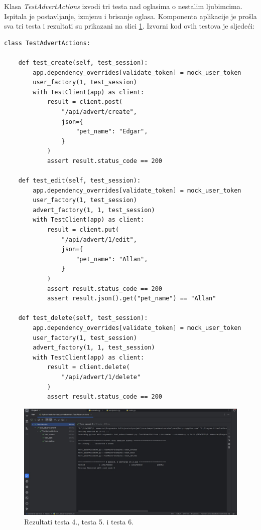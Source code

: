 			Klasa \textit{TestAdvertActions} izvodi tri testa nad oglasima o nestalim ljubimcima. Ispitala je postavljanje, izmjenu i brisanje oglasa. Komponenta aplikacije je prošla sva tri testa i rezultati su prikazani na slici \ref{fig:test4i5i6}. Izvorni kod ovih testova je sljedeći:
			\begin{lstlisting}
class TestAdvertActions:

    def test_create(self, test_session):
        app.dependency_overrides[validate_token] = mock_user_token
        user_factory(1, test_session)
        with TestClient(app) as client:
            result = client.post(
                "/api/advert/create",
                json={
                    "pet_name": "Edgar",
                }
            )
            assert result.status_code == 200

    def test_edit(self, test_session):
        app.dependency_overrides[validate_token] = mock_user_token
        user_factory(1, test_session)
        advert_factory(1, 1, test_session)
        with TestClient(app) as client:
            result = client.put(
                "/api/advert/1/edit",
                json={
                    "pet_name": "Allan",
                }
            )
            assert result.status_code == 200
            assert result.json().get("pet_name") == "Allan"

    def test_delete(self, test_session):
        app.dependency_overrides[validate_token] = mock_user_token
        user_factory(1, test_session)
        advert_factory(1, 1, test_session)
        with TestClient(app) as client:
            result = client.delete(
                "/api/advert/1/delete"
            )
            assert result.status_code == 200
			\end{lstlisting}

			\begin{figure}[H]
			 	\includegraphics[scale=0.42]{slike/test4i5i6.jpg} %
			 	\centering
			 	\caption{Rezultati testa 4., testa 5. i testa 6.}
			 	\label{fig:test4i5i6}
			 \end{figure}

